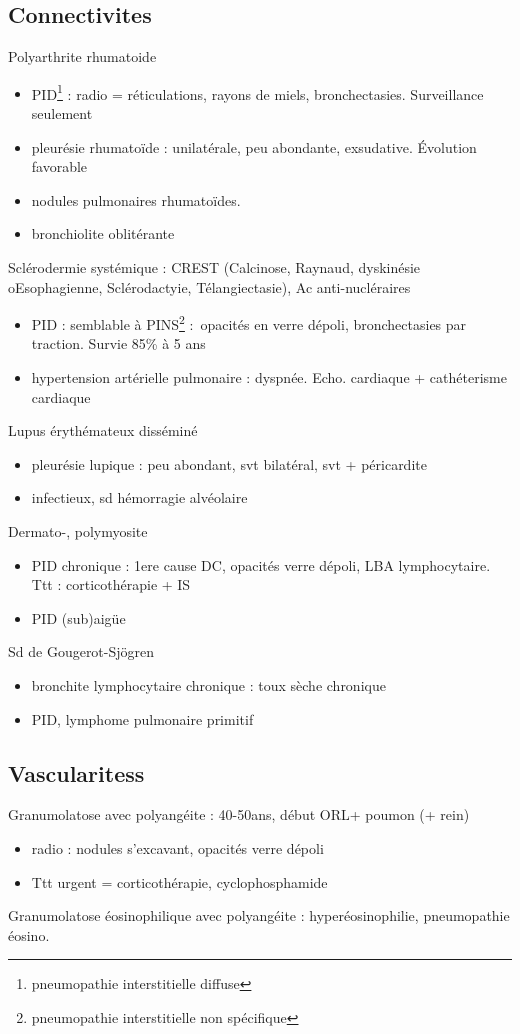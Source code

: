 \documentclass{article}
\begin{document}
\subsection{Connectivites}
Polyarthrite rhumatoide
\begin{itemize}
  \item PID\footnote{pneumopathie interstitielle diffuse} : radio =
    réticulations, rayons de miels, bronchectasies. Surveillance seulement
  \item pleurésie rhumatoïde : unilatérale, peu abondante, exsudative. Évolution
    favorable
  \item nodules pulmonaires rhumatoïdes. 
  \item bronchiolite oblitérante
\end{itemize}
Sclérodermie systémique : CREST (Calcinose, Raynaud, dyskinésie oEsophagienne,
Sclérodactyie, Télangiectasie), Ac anti-nucléraires
\begin{itemize}
  \item PID : semblable à PINS\footnote{pneumopathie interstitielle non
    spécifique} : opacités en verre dépoli, bronchectasies par traction. Survie
    85\% à 5 ans
  \item hypertension artérielle pulmonaire : dyspnée. Echo. cardiaque +
    cathéterisme cardiaque
\end{itemize}
Lupus érythémateux disséminé 
\begin{itemize}
  \item pleurésie lupique : peu abondant, svt bilatéral, svt + péricardite
  \item infectieux, sd hémorragie alvéolaire
\end{itemize}
Dermato-, polymyosite
\begin{itemize}
  \item PID chronique : 1ere cause DC, opacités verre dépoli, LBA lymphocytaire.
    Ttt : corticothérapie + IS
  \item PID (sub)aigüe
\end{itemize}
Sd de Gougerot-Sjögren
\begin{itemize}
  \item bronchite lymphocytaire chronique : toux sèche chronique
  \item PID, lymphome pulmonaire primitif
\end{itemize}

\subsection{Vascularitess}
Granumolatose avec polyangéite : 40-50ans, début ORL+ poumon (+ rein)
\begin{itemize}
  \item radio : nodules s'excavant, opacités verre dépoli
  \item Ttt urgent = corticothérapie, cyclophosphamide
\end{itemize}
Granumolatose éosinophilique avec polyangéite :  hyperéosinophilie, pneumopathie
éosino.
\end{document}
